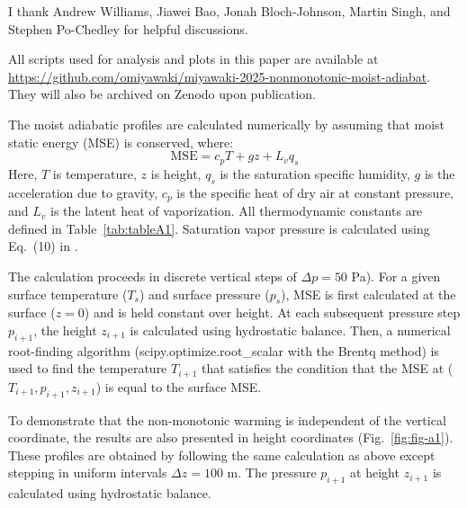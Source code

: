 \documentclass[draft]{ametsocV6.1}
\begin{document}
\acknowledgments
I thank Andrew Williams, Jiawei Bao, Jonah Bloch-Johnson, Martin Singh, and Stephen Po-Chedley for helpful discussions.

% 
%
\datastatement
All scripts used for analysis and plots in this paper are available at \url{https://github.com/omiyawaki/miyawaki-2025-nonmonotonic-moist-adiabat}. They will also be archived on Zenodo upon publication.



\appendix[A] 

The moist adiabatic profiles are calculated numerically by assuming that moist static energy (MSE) is conserved, where:
\begin{equation}
\text{MSE}=c_p T+gz+L_v q_s \label{eq:mse_appendix}
\end{equation}
Here, $T$ is temperature, $z$ is height, $q_s$ is the saturation specific humidity, $g$ is the acceleration due to gravity, $c_p$ is the specific heat of dry air at constant pressure, and $L_v$ is the latent heat of vaporization. All thermodynamic constants are defined in Table~\ref{tab:tableA1}. Saturation vapor pressure is calculated using Eq.~(10) in \cite{bolton1980}.

The calculation proceeds in discrete vertical steps of $\Delta p = 50$ Pa). For a given surface temperature ($T_s$) and surface pressure ($p_s$), MSE is first calculated at the surface ($z=0$) and is held constant over height. At each subsequent pressure step $p_{i+1}$, the height $z_{i+1}$ is calculated using hydrostatic balance. Then, a numerical root-finding algorithm (scipy.optimize.root\_scalar with the Brentq method) is used to find the temperature $T_{i+1}$ that satisfies the condition that the MSE at ($T_{i+1}, p_{i+1}, z_{i+1}$) is equal to the surface MSE.

To demonstrate that the non-monotonic warming is independent of the vertical coordinate, the results are also presented in height coordinates (Fig.~\ref{fig:fig-a1}). These profiles are obtained by following the same calculation as above except stepping in uniform intervals $\Delta z=100$ m. The pressure $p_{i+1}$ at height $z_{i+1}$ is calculated using hydrostatic balance.
\end{document}
